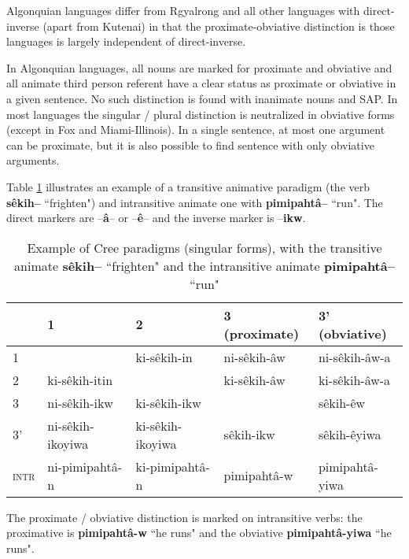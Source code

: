 \documentclass[twoside,a4paper,11pt]{article}
\newcommand{\ipa}[1]{{\phon\textbf{#1}}}
\newcommand{\grise}[1]{\cellcolor{lightgray}\textbf{#1}}
\begin{document}


Algonquian languages differ from Rgyalrong and all other languages with direct-inverse (apart from Kutenai) in that the proximate-obviative distinction is those languages is largely independent of direct-inverse. 

In Algonquian languages, all nouns are marked for proximate and obviative and all animate third person referent have a clear status as proximate or obviative in a given sentence. No such distinction is found with inanimate nouns and SAP. In most languages the singular / plural distinction is neutralized in obviative forms (except in Fox and Miami-Illinois). In a single sentence, at most one argument can be proximate, but it is also possible to find sentence with only obviative arguments. 

Table \ref{tab:cree.tr} illustrates an example of a transitive animative paradigm (the verb \ipa{sêkih--} ``frighten") and intransitive animate one with  \ipa{pimipahtâ--} ``run". The direct markers are --\ipa{â}-- or --\ipa{ê}-- and the inverse marker is --\ipa{ikw}.
 


\begin{table}[h]
\caption{Example of Cree paradigms (singular forms), with the transitive animate \ipa{sêkih--} ``frighten" and the intransitive animate  \ipa{pimipahtâ--} ``run"}\label{tab:cree.tr} \centering
\begin{tabular}{l|l|l|l|l}
\toprule
   & 	1   & 	2   & 	3   (proximate) & 	3'  (obviative) \\ 
\midrule
1   & 	\grise{}   & 	ki-sêkih-in   & 	\cellcolor[wave]{410}ni-sêkih-âw   & \cellcolor[wave]{410}	ni-sêkih-âw-a   \\ 
\hline
2   & 	ki-sêkih-itin   & 		\grise{}   & 	\cellcolor[wave]{410}ki-sêkih-âw   &\cellcolor[wave]{410} 	ki-sêkih-âw-a   \\ 
   \hline
3   & 	\cellcolor[wave]{500}ni-sêkih-ikw   & \cellcolor[wave]{500}	ki-sêkih-ikw   & 		\grise{}   & \cellcolor[wave]{410}	sêkih-êw   \\ 
   \hline
3'   & 	\cellcolor[wave]{500}ni-sêkih-ikoyiwa   & 	\cellcolor[wave]{410}\cellcolor[wave]{500}ki-sêkih-ikoyiwa   &\cellcolor[wave]{500} 	sêkih-ikw   & 	sêkih-êyiwa   \\ 
\hline
\textsc{intr} & ni-pimipahtâ-n&ki-pimipahtâ-n& pimipahtâ-w&pimipahtâ-yiwa \\
\bottomrule
\end{tabular}
\end{table}
The proximate / obviative distinction is marked on intransitive verbs: the proximative is \ipa{pimipahtâ-w} ``he runs" and the obviative \ipa{pimipahtâ-yiwa} ``he runs". 
\end{document}
